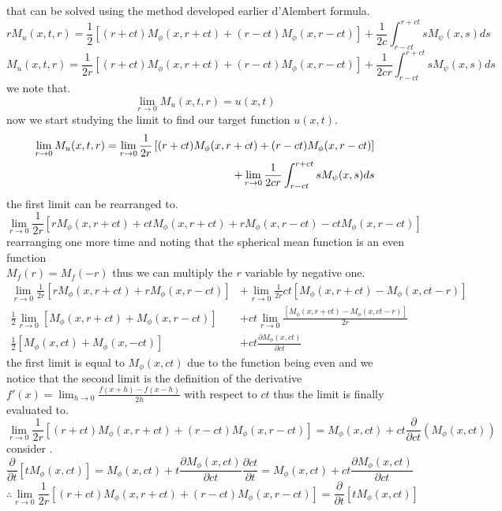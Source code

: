 \documentclass[]{article}
\begin{document}
that can be solved using the method developed earlier d'Alembert formula.
\[
    rM_u(x,t,r) = \frac{1}{2}\left[(r+ct)M_\phi(x,r+ct)+(r-ct)M_\phi(x,r-ct)\right]+\frac{1}{2c}\int_{r-ct}^{r+ct} sM_\psi(x,s)ds    
\]
\begin{equation}
M_u(x,t,r) = \frac{1}{2r}\left[(r+ct)M_\phi(x,r+ct)+(r-ct)M_\phi(x,r-ct)\right]+\frac{1}{2cr}\int_{r-ct}^{r+ct} sM_\psi(x,s)ds
\end{equation}
we note that.
\[
\lim_{r\to 0} M_u(x,t,r) = u(x,t)    
\]
now we start studying the limit to find our target function $u(x,t)$.
\begin{align}
\lim_{r\to 0} M_u(x,t,r) = \lim_{r\to 0}\frac{1}{2r}\left[(r+ct)M_\phi(x,r+ct)+(r-ct)M_\phi(x,r-ct)\right] \notag
\\
+\lim_{r\to 0}\frac{1}{2cr}\int_{r-ct}^{r+ct} sM_\psi(x,s)ds
\end{align}
the first limit can be rearranged to.
\[
    \lim_{r\to 0} \frac{1}{2r}\left[rM_\phi(x,r+ct)+ctM_\phi(x,r+ct)+rM_\phi(x,r-ct)-ctM_\phi(x,r-ct)\right]    
\]
rearranging one more time and noting that the spherical mean function is an even function 
\\
$\displaystyle M_f(r)=M_f(-r)$ thus we can multiply the $r$ variable by negative one.
\begin{align*}
    \lim_{r\to 0} \frac{1}{2r}\left[rM_\phi(x,r+ct)+rM_\phi(x,r-ct)\right] & +\lim_{r\to 0} \frac{1}{2r}ct\left[M_\phi(x,r+ct)-M_\phi(x,ct-r)\right]
    \\
    \frac{1}{2} \lim_{r\to 0} \left[M_\phi(x,r+ct)+M_\phi(x,r-ct)\right] & + ct \lim_{r\to 0} \frac{\left[M_\phi(x,r+ct)-M_\phi(x,ct-r)\right]}{2r}
    \\
    \frac{1}{2} \left[M_\phi(x,ct)+M_\phi(x,-ct)\right] & + ct \frac{\partial M_\phi(x,ct)}{\partial ct}
\end{align*}
the first limit is equal to $M_\phi(x,ct)$ due to the function being even and we notice that the second limit is the definition of the derivative$\displaystyle f'(x) = \lim_{h\to 0} \frac{f(x+h) - f(x-h)}{2h}$ with respect to $ct$ thus the limit is finally evaluated to.
\[
    \lim_{r\to 0}\frac{1}{2r}\left[(r+ct)M_\phi(x,r+ct)+(r-ct)M_\phi(x,r-ct)\right] = M_\phi(x,ct) + ct\frac{\partial}{\partial ct}(M_\phi(x,ct))    
\]
consider .
\[
    \frac{\partial}{\partial t}[tM_\phi(x,ct)] = M_\phi(x,ct)+t \frac{\partial M_\phi(x,ct)}{\partial ct}\frac{\partial ct}{\partial t} = M_\phi(x,ct)+ct \frac{\partial M_\phi(x,ct)}{\partial ct}    
\]
\[
\therefore \lim_{r\to 0}\frac{1}{2r}\left[(r+ct)M_\phi(x,r+ct)+(r-ct)M_\phi(x,r-ct)\right] = \frac{\partial}{\partial t}[tM_\phi(x,ct)]    
\]
\end{document}
